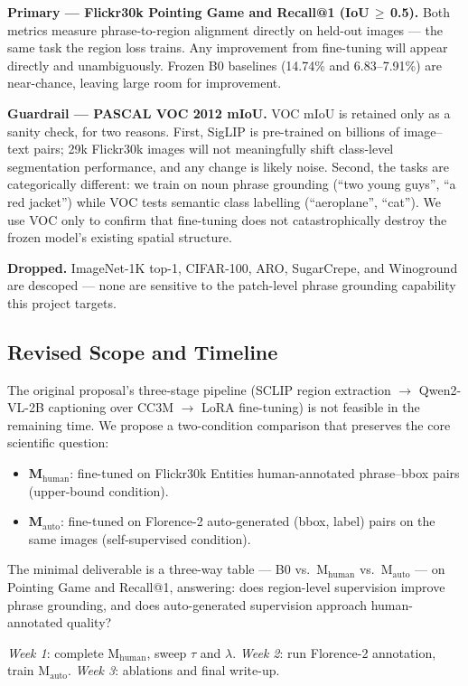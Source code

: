 \documentclass[10pt,onecolumn]{article}
\begin{document}
\textbf{Primary --- Flickr30k Pointing Game and Recall@1 (IoU\,$\geq$\,0.5).}
Both metrics measure phrase-to-region alignment directly on held-out images ---
the same task the region loss trains. Any improvement from fine-tuning will appear
directly and unambiguously. Frozen B0 baselines (14.74\% and 6.83--7.91\%) are
near-chance, leaving large room for improvement.

\textbf{Guardrail --- PASCAL VOC 2012 mIoU.}
VOC mIoU is retained only as a sanity check, for two reasons. First, SigLIP is
pre-trained on billions of image--text pairs; 29k Flickr30k images will not
meaningfully shift class-level segmentation performance, and any change is likely
noise. Second, the tasks are categorically different: we train on noun phrase
grounding (``two young guys'', ``a red jacket'') while VOC tests semantic class
labelling (``aeroplane'', ``cat''). We use VOC only to confirm that fine-tuning
does not catastrophically destroy the frozen model's existing spatial structure.

\textbf{Dropped.} ImageNet-1K top-1, CIFAR-100, ARO, SugarCrepe, and Winoground
are descoped --- none are sensitive to the patch-level phrase grounding capability
this project targets.

\subsection{Revised Scope and Timeline}

The original proposal's three-stage pipeline (SCLIP region extraction $\to$
Qwen2-VL-2B captioning over CC3M $\to$ LoRA fine-tuning) is not feasible in the
remaining time. We propose a two-condition comparison that preserves the core
scientific question:

\begin{itemize}[leftmargin=1.5em, itemsep=1pt]
    \item \textbf{M$_\text{human}$}: fine-tuned on Flickr30k Entities human-annotated
    phrase--bbox pairs (upper-bound condition).
    \item \textbf{M$_\text{auto}$}: fine-tuned on Florence-2 auto-generated (bbox, label)
    pairs on the same images (self-supervised condition).
\end{itemize}

The minimal deliverable is a three-way table --- B0 vs.\ M$_\text{human}$ vs.\
M$_\text{auto}$ --- on Pointing Game and Recall@1, answering: does region-level
supervision improve phrase grounding, and does auto-generated supervision approach
human-annotated quality?

\textit{Week 1}: complete M$_\text{human}$, sweep $\tau$ and $\lambda$.
\textit{Week 2}: run Florence-2 annotation, train M$_\text{auto}$.
\textit{Week 3}: ablations and final write-up.
\end{document}
